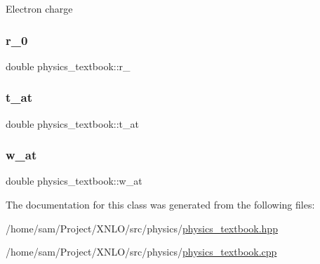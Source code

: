 Electron charge \mbox{\label{classphysics__textbook_ac429976f0dc885d846d8b31c24f45bd6}} 
\subsubsection{\texorpdfstring{r\_0}{r\_0}}
{\footnotesize\ttfamily double physics\+\_\+textbook\+::r\+\_}

\mbox{\label{classphysics__textbook_acdcf772ff70c544f8394b3a9fc57674c}} 
\subsubsection{\texorpdfstring{t\_at}{t\_at}}
{\footnotesize\ttfamily double physics\+\_\+textbook\+::t\+\_\+at}

\mbox{\label{classphysics__textbook_a63250c79f053fa4aa1c8f3505971b4f1}} 
\subsubsection{\texorpdfstring{w\_at}{w\_at}}
{\footnotesize\ttfamily double physics\+\_\+textbook\+::w\+\_\+at}



The documentation for this class was generated from the following files\+:\begin{DoxyCompactItemize}
\item 
/home/sam/\+Project/\+X\+N\+L\+O/src/physics/\mbox{\hyperlink{physics__textbook_8hpp}{physics\+\_\+textbook.\+hpp}}\item 
/home/sam/\+Project/\+X\+N\+L\+O/src/physics/\mbox{\hyperlink{physics__textbook_8cpp}{physics\+\_\+textbook.\+cpp}}\end{DoxyCompactItemize}
